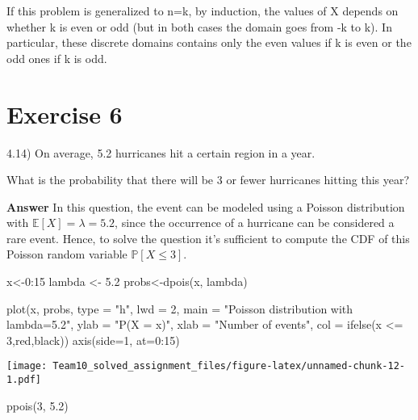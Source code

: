 \documentclass[
]{article}
\newenvironment{Shaded}{\begin{snugshade}}{\end{snugshade}}
\newcommand{\AttributeTok}[1]{\textcolor[rgb]{0.77,0.63,0.00}{#1}}
\newcommand{\DecValTok}[1]{\textcolor[rgb]{0.00,0.00,0.81}{#1}}
\newcommand{\FloatTok}[1]{\textcolor[rgb]{0.00,0.00,0.81}{#1}}
\newcommand{\FunctionTok}[1]{\textcolor[rgb]{0.00,0.00,0.00}{#1}}
\newcommand{\NormalTok}[1]{#1}
\newcommand{\OtherTok}[1]{\textcolor[rgb]{0.56,0.35,0.01}{#1}}
\newcommand{\SpecialCharTok}[1]{\textcolor[rgb]{0.00,0.00,0.00}{#1}}
\newcommand{\StringTok}[1]{\textcolor[rgb]{0.31,0.60,0.02}{#1}}
\begin{document}
If this problem is generalized to n=k, by induction, the values of X
depends on whether k is even or odd (but in both cases the domain goes
from -k to k). In particular, these discrete domains contains only the
even values if k is even or the odd ones if k is odd.

\hypertarget{exercise-6}{%
\section{Exercise 6}\label{exercise-6}}

4.14) On average, 5.2 hurricanes hit a certain region in a year.

What is the probability that there will be 3 or fewer hurricanes hitting
this year?

\textbf{Answer} In this question, the event can be modeled using a
Poisson distribution with \(\mathbb E[X]=\lambda=5.2\), since the
occurrence of a hurricane can be considered a rare event. Hence, to
solve the question it's sufficient to compute the CDF of this Poisson
random variable \(\mathbb P[X \leq 3]\).

\begin{Shaded}
\begin{Highlighting}[]
\NormalTok{x}\OtherTok{\textless{}{-}}\DecValTok{0}\SpecialCharTok{:}\DecValTok{15}
\NormalTok{lambda }\OtherTok{\textless{}{-}} \FloatTok{5.2}
\NormalTok{probs}\OtherTok{\textless{}{-}}\FunctionTok{dpois}\NormalTok{(x, lambda)}

\FunctionTok{plot}\NormalTok{(x, probs, }\AttributeTok{type =} \StringTok{"h"}\NormalTok{, }\AttributeTok{lwd =} \DecValTok{2}\NormalTok{,}
     \AttributeTok{main =} \StringTok{"Poisson distribution with lambda=5.2"}\NormalTok{,}
     \AttributeTok{ylab =} \StringTok{"P(X = x)"}\NormalTok{, }\AttributeTok{xlab =} \StringTok{"Number of events"}\NormalTok{, }\AttributeTok{col =} \FunctionTok{ifelse}\NormalTok{(x }\SpecialCharTok{\textless{}=} \DecValTok{3}\NormalTok{,}\StringTok{\textquotesingle{}red\textquotesingle{}}\NormalTok{,}\StringTok{\textquotesingle{}black\textquotesingle{}}\NormalTok{))}
\FunctionTok{axis}\NormalTok{(}\AttributeTok{side=}\DecValTok{1}\NormalTok{, }\AttributeTok{at=}\DecValTok{0}\SpecialCharTok{:}\DecValTok{15}\NormalTok{)}
\end{Highlighting}
\end{Shaded}

\texttt{[image: Team10\_solved\_assignment\_files/figure-latex/unnamed-chunk-12-1.pdf]}

\begin{Shaded}
\begin{Highlighting}[]
\FunctionTok{ppois}\NormalTok{(}\DecValTok{3}\NormalTok{, }\FloatTok{5.2}\NormalTok{)}
\end{Highlighting}
\end{Shaded}
\end{document}
